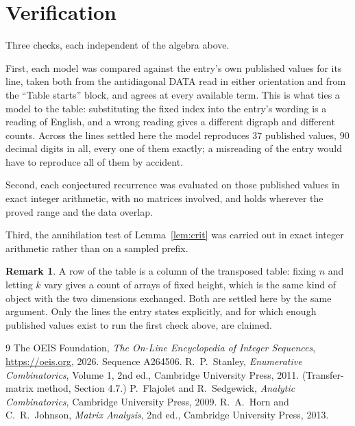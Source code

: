 \documentclass[11pt,a4paper]{article}
\theoremstyle{plain}
\theoremstyle{definition}
\newtheorem{remark}[theorem]{Remark}
\begin{document}
\section{Verification}

Three checks, each independent of the algebra above.

First, each model was compared against the entry's own published values for its line, taken
both from the antidiagonal DATA read in either orientation and from the ``Table starts''
block, and agrees at every available term. This is what ties a model to the table:
substituting the fixed index into the entry's wording is a reading of English, and a wrong
reading gives a different digraph and different counts. Across the lines settled here the
model reproduces $37$ published values, $90$ decimal digits in all, every one of
them exactly; a misreading of the entry would have to reproduce all of them by accident.

Second, each conjectured recurrence was evaluated on those published values in exact
integer arithmetic, with no matrices involved, and holds wherever the proved range and the
data overlap.

Third, the annihilation test of Lemma~\ref{lem:crit} was carried out in exact integer
arithmetic rather than on a sampled prefix.

\begin{remark}
A row of the table is a column of the transposed table: fixing $n$ and letting $k$ vary gives a
count of arrays of fixed height, which is the same kind of object with the two dimensions
exchanged. Both are settled here by the same argument. Only the lines the entry states
explicitly, and for which enough published values exist to run the first check above, are
claimed.
\end{remark}

\begin{thebibliography}{9}
 The OEIS Foundation, \emph{The On-Line Encyclopedia of Integer
Sequences}, \url{https://oeis.org}, 2026. Sequence A264506.
 R.~P.~Stanley, \emph{Enumerative Combinatorics}, Volume 1, 2nd ed.,
Cambridge University Press, 2011. (Transfer-matrix method, Section 4.7.)
 P.~Flajolet and R.~Sedgewick, \emph{Analytic Combinatorics}, Cambridge
University Press, 2009.
 R.~A.~Horn and C.~R.~Johnson, \emph{Matrix Analysis}, 2nd ed., Cambridge
University Press, 2013.
\end{thebibliography}
\end{document}
